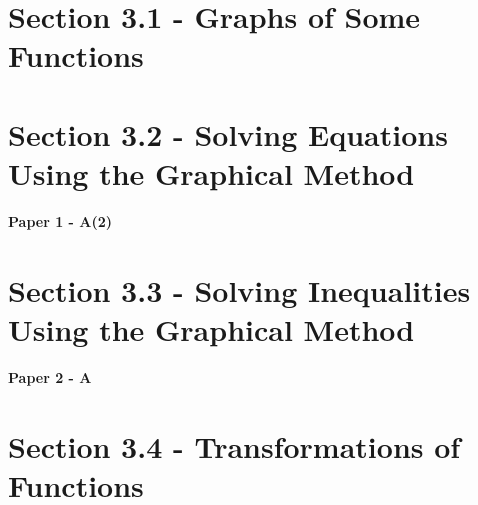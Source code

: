 \documentclass[12pt, a4paper]{article}
\begin{document}
\section*{Section 3.1 - Graphs of Some Functions}\label{section:6-3-1}





\section*{Section 3.2 - Solving Equations Using the Graphical Method}\label{section:6-3-2}

\textbf{Paper 1 - A(2)}
\begin{enumx}[label=\arabic*.,start=1]
\item {}\label{DSE2012-CoreP1-Q13} 
\end{enumx}




\section*{Section 3.3 - Solving Inequalities Using the Graphical Method}\label{section:6-3-3}

\textbf{Paper 2 - A}
\begin{enumx}[label=\arabic*.,start=2]
\item {}\label{DSE2012S-CoreP2-Q08} 
\end{enumx}




\section*{Section 3.4 - Transformations of Functions \NF}\label{section:6-3-4}
\end{document}
